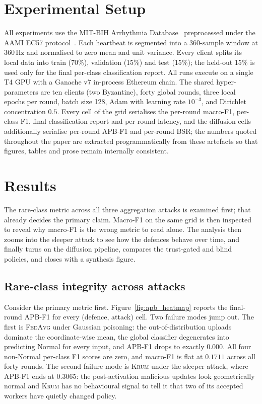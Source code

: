 \documentclass[runningheads]{llncs}
\newcommand{\fedavg}{\textsc{FedAvg}\xspace}
\newcommand{\krum}{\textsc{Krum}\xspace}
\begin{document}
\section{Experimental Setup}
\label{sec:setup}

All experiments use the MIT-BIH Arrhythmia Database~%
\cite{moody2001mitbih} preprocessed under the AAMI EC57
protocol~\cite{aami1998ec57}. Each heartbeat is segmented into a
360-sample window at 360\,Hz and normalised to zero mean and unit
variance. Every client splits its local data into train (70\%),
validation (15\%) and test (15\%); the held-out 15\% is used only
for the final per-class classification report. All runs execute on
a single T4 GPU with a Ganache v7 in-process Ethereum chain. The
shared hyper-parameters are ten clients (two Byzantine), forty
global rounds, three local epochs per round, batch size 128, Adam
with learning rate $10^{-3}$, and Dirichlet concentration $0.5$.
Every cell of the grid serialises the per-round macro-F1, per-class
F1, final classification report and per-round latency, and the
diffusion cells additionally serialise per-round APB-F1 and per-round
BSR; the numbers quoted throughout the paper are extracted
programmatically from these artefacts so that figures, tables and
prose remain internally consistent.

\section{Results}
\label{sec:results}

The rare-class metric across all three aggregation attacks is
examined first; that already decides the primary claim. Macro-F1 on
the same grid is then inspected to reveal why macro-F1 is the wrong
metric to read alone. The analysis then zooms into the sleeper
attack to see how the defences behave over time, and finally turns
on the diffusion pipeline, compares the trust-gated and blind
policies, and closes with a synthesis figure.

\subsection{Rare-class integrity across attacks}
\label{subsec:apb_heatmap}
Consider the primary metric first. Figure~\ref{fig:apb_heatmap}
reports the final-round APB-F1 for every (defence, attack) cell.
Two failure modes jump out. The first is \fedavg under Gaussian
poisoning: the out-of-distribution uploads dominate the
coordinate-wise mean, the global classifier degenerates into
predicting Normal for every input, and APB-F1 drops to exactly
$0.000$. All four non-Normal per-class F1 scores are zero, and
macro-F1 is flat at $0.1711$ across all forty rounds. The second
failure mode is \krum under the sleeper attack, where APB-F1 ends at
$0.3065$: the post-activation malicious updates look geometrically
normal and \krum has no behavioural signal to tell it that two of
its accepted workers have quietly changed policy.
\end{document}
